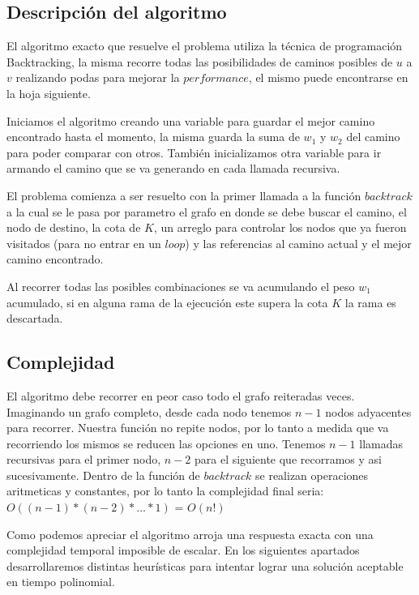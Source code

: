 \subsection{Descripci\'on del algoritmo}

El algoritmo exacto que resuelve el problema utiliza la t\'ecnica de programaci\'on Backtracking, la misma recorre todas las posibilidades de caminos posibles de $u$ a $v$ realizando podas para mejorar la $performance$, el mismo puede encontrarse en la hoja siguiente.

Iniciamos el algoritmo creando una variable para guardar el mejor camino encontrado hasta el momento, la misma guarda la suma de $w_{1}$ y $w_{2}$ del camino para poder comparar con otros. Tambi\'en inicializamos otra variable para ir armando el camino que se va generando en cada llamada recursiva.

El problema comienza a ser resuelto con la primer llamada a la funci\'on $backtrack$ a la cual se le pasa por parametro el grafo en donde se debe buscar el camino, el nodo de destino, la cota de $K$, un arreglo para controlar los nodos que ya fueron visitados (para no entrar en un $loop$) y las referencias al camino actual y el mejor camino encontrado.

Al recorrer todas las posibles combinaciones se va acumulando el peso $w_{1}$ acumulado, si en alguna rama de la ejecuci\'on este supera la cota $K$ la rama es descartada.

\subsection{Complejidad}

El algoritmo debe recorrer en peor caso todo el grafo reiteradas veces. Imaginando un grafo completo, desde cada nodo tenemos $n-1$ nodos adyacentes para recorrer. Nuestra funci\'on no repite nodos, por lo tanto a medida que va recorriendo los mismos se reducen las opciones en uno. Tenemos $n-1$ llamadas recursivas para el primer nodo, $n-2$ para el siguiente que recorramos y asi sucesivamente. Dentro de la funci\'on de $backtrack$ se realizan operaciones aritmeticas y constantes, por lo tanto la complejidad final seria: $O((n-1)*(n-2)*...*1)$ = $O(n!)$

Como podemos apreciar el algoritmo arroja una respuesta exacta con una complejidad temporal imposible de escalar. En los siguientes apartados desarrollaremos distintas heur\'isticas para intentar lograr una soluci\'on aceptable en tiempo polinomial.

